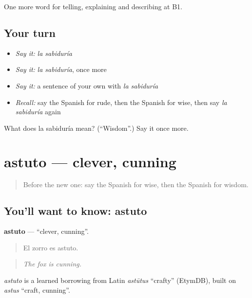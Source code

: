 \begin{grammarlens}[title={What you've built}]
One more word for telling, explaining and describing at B1.
\end{grammarlens}

\subsection*{Your turn}
\begin{itemize}
\raggedright
  \item \emph{Say it:} \emph{la sabiduría}
  \item \emph{Say it:} \emph{la sabiduría}, once more
  \item \emph{Say it:} a sentence of your own with \emph{la sabiduría}
  \item \emph{Recall:} say the Spanish for rude, then the Spanish for wise, then say \emph{la sabiduría} again
\end{itemize}

\begin{tcolorbox}[breakable,colback=teal!4,colframe=teal!35!black,title={Before you move on}]
What does la sabiduría mean? (\textquotedblleft{}Wisdom\textquotedblright{}.) Say it once more.
\end{tcolorbox}
\section[astuto]{astuto — clever, cunning}

\label{lesson:ES-C728-astuto}



\begin{quote}
Before the new one: say the Spanish for wise, then the Spanish for wisdom.
\end{quote}

\subsection*{You'll want to know: astuto}
\textbf{astuto} — \textquotedblleft{}clever, cunning\textquotedblright{}.

\begin{quote}
El zorro es astuto.
\end{quote}

\begin{quote}
\emph{The fox is cunning.}
\end{quote}

\begin{cousinweb}
\emph{astuto} is a learned borrowing from Latin \emph{astūtus} \textquotedblleft{}crafty\textquotedblright{} (EtymDB), built on \emph{astus} \textquotedblleft{}craft, cunning\textquotedblright{}.
\end{cousinweb}

